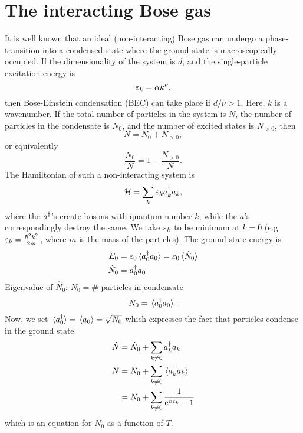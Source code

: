 \section{The interacting Bose gas}

It is well known that an ideal (non-interacting) Bose gas can undergo a phase-transition into a condensed state where the ground state is macroscopically occupied. If the dimensionality of the system is \emph{$d$}, and the single-particle excitation energy is
\begin{equation}
	\varepsilon_k = \alpha k^\nu,
\end{equation}
then Bose-Einstein condensation (BEC) can take place if $d/\nu > 1$. 
Here, $k$ is a wavenumber. If the total number of particles in the system is $N$, the number of particles in the condensate is $N_0$, and the number of excited states is $N_{>0}$, then 
\begin{equation}
	N = N_0 +N_{>0},
\end{equation}
or equivalently
\begin{equation}
	\frac{N_0}{N} = 1 - \frac{N_{>0}}{N}.
\end{equation}
The Hamiltonian of such a non-interacting system is
\begin{equation}
	\mathcal{H} = \sum_{k}\varepsilon_k a_{k}^{\dagger}a_{k},
\end{equation}
where the $a^{\dagger}$'s create bosons with quantum number  $k$, while the $a$'s correspondingly destroy the same. We take $\varepsilon_k$ to be minimum at $k=0$ (e.g $\varepsilon_k = \frac{\hbar^2k^2}{2m}$, where $m$ is the mass of the particles).
The ground state energy is 
\begin{align}
	E_0 &= \ep_0\ev*{a_{0}^{\dg}a_{0}} = \ep_0\ev*{\hat{N}_{0}} \\
	\hat{N}_{0} &= a_{0}^{\dg}a_{0}
\end{align}
Eigenvalue of $	\hat{N}_{0}$: $N_0 = \#$  particles in condensate
\begin{equation}
	N_0 = \ev*{a_{0}^{\dg}a_{0}}.
\end{equation}
Now, we set $\ev*{a_0^{\dg}} = \ev*{a_0} = \sqrt{N_0}$ which expresses the fact that particles condense in the ground state. 
\begin{align}
	\hat{N} &= \hat{N}_0 + \sum_{k\ne0}a_{k}^{\dg}a_{k} \\
	N&= N_0 + \sum_{k\ne0}\ev*{a_{k}^{\dg}a_{k}} \nonumber \\
	&= N_0 + \sum_{k\ne0}\frac{1}{\e^{\beta\ep_k}-1}
\end{align}
which is an equation for $N_0$ as a function of $T$.
